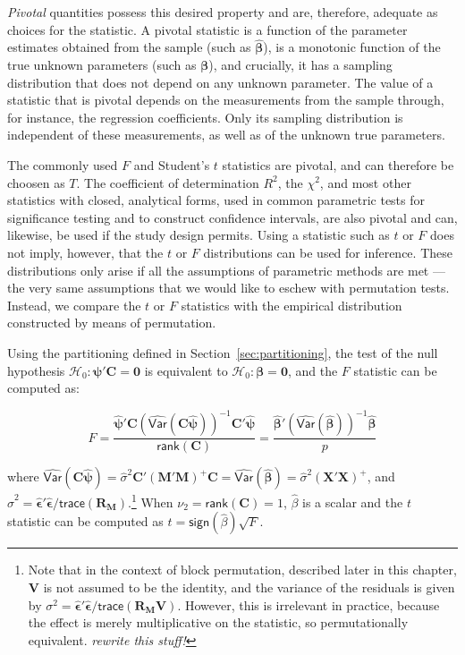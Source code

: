 \emph{Pivotal} quantities possess this desired property and are, therefore, adequate as choices for the statistic. A pivotal statistic is a function of the parameter estimates obtained from the sample (such as $\boldsymbol{\hat{\beta}}$), is a monotonic function of the true unknown parameters (such as $\boldsymbol{\beta}$), and crucially, it has a sampling distribution that does not depend on any unknown parameter. The value of a statistic that is pivotal depends on the measurements from the sample through, for instance, the regression coefficients. Only its sampling distribution is independent of these measurements, as well as of the unknown true parameters.

The commonly used $F$ and Student's $t$ statistics are pivotal, and can therefore be choosen as $T$. The coefficient of determination $R^2$, the $\chi^2$, and most other statistics with closed, analytical forms, used in common parametric tests for significance testing and to construct confidence intervals, are also pivotal and can, likewise, be used if the study design permits. Using a statistic such as $t$ or $F$ does not imply, however, that the $t$ or $F$ distributions can be used for inference. These distributions only arise if all the assumptions of parametric methods are met --- the very same assumptions that we would like to eschew with permutation tests. Instead, we compare the $t$ or $F$ statistics with the empirical distribution constructed by means of permutation.

Using the partitioning defined in Section~\ref{sec:partitioning}, the test of the null hypothesis $\mathcal{H}_0 : \boldsymbol{\psi}'\mathbf{C}=\boldsymbol{0}$ is equivalent to $\mathcal{H}_0 : \boldsymbol{\beta}=\boldsymbol{0}$, and the $F$ statistic can be computed as:

\begin{equation}
F =
\frac{\boldsymbol{\hat{\psi}}'\mathbf{C} \left(\widehat{\mathsf{Var}}(\boldsymbol{\mathbf{C}\hat{\psi}}) \right)^{-1} \mathbf{C}'\boldsymbol{\hat{\psi}}}{\mathsf{rank}(\mathbf{C})}
=
\frac{\boldsymbol{\hat{\beta}}' \left( \widehat{\mathsf{Var}}(\boldsymbol{\hat{\beta}}) \right)^{-1}\boldsymbol{\hat{\beta}}}{p}
\end{equation}

\noindent
where $\widehat{\mathsf{Var}}(\boldsymbol{\mathbf{C}\hat{\psi}}) = \hat{\sigma}^2\mathbf{C}'(\mathbf{M}'\mathbf{M})^{+}\mathbf{C} = \widehat{\mathsf{Var}}(\boldsymbol{\hat{\beta}}) = \hat{\sigma}^2(\mathbf{X}'\mathbf{X})^{+}$, and $\hat{\sigma}^2 = \boldsymbol{\hat{\epsilon}}'\boldsymbol{\hat{\epsilon}}/\mathsf{trace}(\mathbf{R}_{\mathbf{M}})$.\footnote{Note that in the context of block permutation, described later in this chapter, $\mathbf{V}$ is not assumed to be the identity, and the variance of the residuals is given by $\sigma^2 = \boldsymbol{\hat{\epsilon}}'\boldsymbol{\hat{\epsilon}}/\mathsf{trace}(\mathbf{R}_{\mathbf{M}}\mathbf{V})$. However, this is irrelevant in practice, because the effect is merely multiplicative on the statistic, so permutationally equivalent. {\color{orange} \emph{rewrite this stuff!}}} When $\nu_{2}  = \mathsf{rank}(\mathbf{C}) = 1$, $\hat{\beta}$ is a scalar and the $t$ statistic can be computed as $t=\mathsf{sign}(\hat{\beta})\sqrt{F}$.


